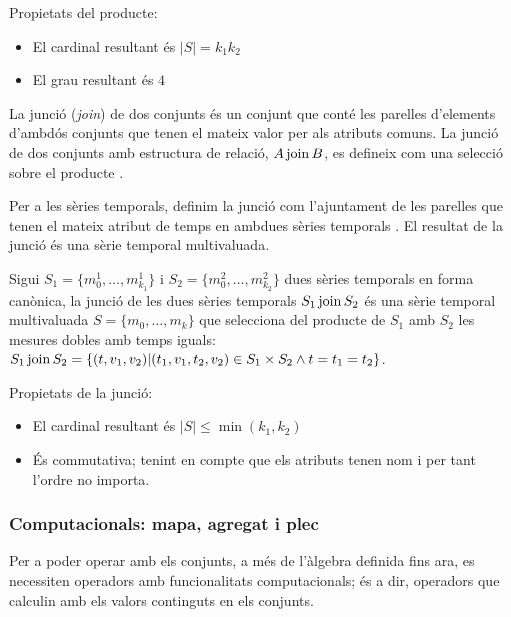 Propietats del producte:
\begin{itemize}
\item El cardinal resultant és $|S|=k_1k_2$
\item El grau resultant és $4$
\end{itemize}



La junció (\emph{join}) de dos conjunts és un conjunt que conté les
parelles d'elements d'ambdós conjunts que tenen el mateix valor per
als atributs comuns.  La junció de dos conjunts amb estructura de
relació, $A \operatorname*{join} B$, es defineix com una selecció sobre el
producte \parencite{date:introduction}.


Per a les sèries temporals, definim la junció com l'ajuntament de les
parelles que tenen el mateix atribut de temps en ambdues sèries
temporals . El resultat de la junció és una sèrie temporal
multivaluada.
\begin{definition}[junció]\label{def:sgst:join}
  Sigui $S_1=\{m_0^1, \dotsc, m_{k_1}^1\}$ i $S_2=\{m_0^2, \dotsc,
  m_{k_2}^2\}$ dues sèries temporals en forma canònica, la junció de
  les dues sèries temporals $S_1 \operatorname*{join} S_2$ és una sèrie temporal
  multivaluada $S=\{m_0, \dotsc, m_k\}$ que selecciona del producte de
  $S_1$ amb $S_2$ les mesures dobles amb temps iguals: $S_1 \operatorname*{join} S_2
  = \{ (t,v_1,v_2) | (t_1,v_1,t_2,v_2) \in S_1\times S_2 \wedge
  t=t_1=t_2 \}$.
\end{definition}


Propietats de la junció:
\begin{itemize}
\item El cardinal resultant és $|S|\leq\min(k_1,k_2)$
\item És commutativa; tenint en compte que els atributs tenen nom i
  per tant l'ordre no importa.
\end{itemize}







\subsubsection{Computacionals: mapa, agregat i plec}

Per a poder operar amb els conjunts, a més de l'àlgebra definida fins
ara, es necessiten operadors amb funcionalitats computacionals; és a
dir, operadors que calculin amb els valors continguts en els conjunts. 

